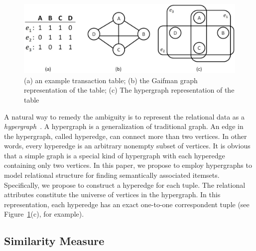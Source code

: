 \begin{figure}[tbh]
\begin{center}
\includegraphics[width=.8\textwidth]{fig/hg_and_rg1.eps}
\end{center}
\caption[An example of simple graph vs. hypergraph for representing a relational table.]{\label{fig:hg_and_rg} (a) an example transaction table; (b) the Gaifman graph representation of the table; (c) The hypergraph representation of the table}
\end{figure}

A natural way to remedy the ambiguity is to represent the relational data as a \emph{hypergraph}~\cite{Hypergraph}. A hypergraph is a generalization of traditional graph. An edge in the hypergraph, called hyperedge, can connect more than two vertices. In other words, every hyperedge is an arbitrary nonempty subset of vertices. It is obvious that a simple graph is a special kind of hypergraph with each hyperedge containing only two vertices. In this paper, we propose to employ hypergraphs to model relational structure for finding semantically associated itemsets. Specifically, we propose to construct a hyperedge for each tuple. The relational attributes constitute the universe of vertices in the hypergraph. In this representation, each hyperedge has an exact one-to-one correspondent tuple (see Figure~\ref{fig:hg_and_rg}(c), for example).

\subsection{Similarity Measure}

